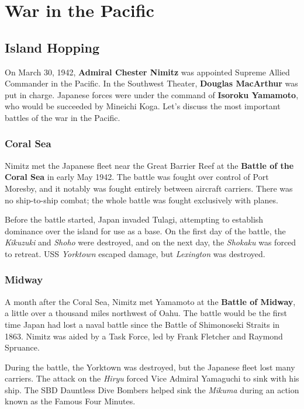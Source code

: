 \section{War in the Pacific}

\subsection*{Island Hopping}

On March 30, 1942, \textbf{Admiral Chester Nimitz} was appointed Supreme Allied Commander in the Pacific.
In the Southwest Theater, \textbf{Douglas MacArthur} was put in charge.
Japanese forces were under the command of \textbf{Isoroku Yamamoto}, who would be succeeded by Mineichi Koga.
Let's discuss the most important battles of the war in the Pacific.

\subsubsection*{Coral Sea}

Nimitz met the Japanese fleet near the Great Barrier Reef at the \textbf{Battle of the Coral Sea}
in early May 1942.
The battle was fought over control of Port Moresby, and it notably was fought entirely between aircraft carriers.
There was no ship-to-ship combat; the whole battle was fought exclusively with planes.

Before the battle started, Japan invaded Tulagi,
attempting to establish dominance over the island for use as a base.
On the first day of the battle, the \textit{Kikuzuki} and \textit{Shoho} were destroyed,
and on the next day, the \textit{Shokaku} was forced to retreat.
USS \textit{Yorktown} escaped damage, but \textit{Lexington} was destroyed.

\subsubsection*{Midway}

A month after the Coral Sea, Nimitz met Yamamoto at the \textbf{Battle of Midway},
a little over a thousand miles northwest of Oahu.
The battle would be the first time Japan had lost a naval battle since the Battle of Shimonoseki Straits in 1863.
Nimitz was aided by a Task Force, led by Frank Fletcher and Raymond Spruance.

During the battle, the Yorktown was destroyed, but the Japanese fleet lost many carriers.
The attack on the \textit{Hiryu} forced Vice Admiral Yamaguchi to sink with his ship.
The SBD Dauntless Dive Bombers helped sink the \textit{Mikuma} during an action known as the Famous Four Minutes.

